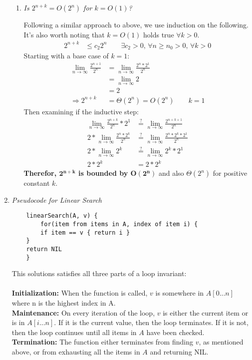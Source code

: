 \documentclass[12pt]{article}
\begin{document}
\begin{enumerate}
\begin{enumerate}
    \item \textit{Is $2^{n+k} = O(2^n)$ for $k = O(1)$?}    

    Following a similar approach to above, we use induction on the following. It's also worth noting that $k=O(1)$ holds true $\forall k>0$.
    \begin{align*}
    2^{n+k} &\leq c_2 2^n \qquad \exists c_2 > 0, \, \forall n\geq n_0 > 0, \, \forall k > 0 
    \end{align*}
    Starting with a base case of $k=1$:
    \begin{align*}
    \lim_{n\to\infty}\frac{2^{n+1}}{2^n} &= \lim_{n\to\infty}\frac{2^n*2^1}{2^n} \\
    &= \lim_{n\to\infty}2 \\
    &= 2 \\
    \Rightarrow 2^{n+k} &= \Theta(2^n) = O(2^n) \qquad k = 1
    \end{align*}
    Then examining if the inductive step:
    \begin{align*}
    \lim_{n\to\infty}\frac{2^{n+k}}{2^n} * 2^1 &\stackrel{?}{=} \lim_{n\to\infty}\frac{2^{n+k+1}}{2^n} \\
    2*\lim_{n\to\infty}\frac{2^n*2^k}{2^n} &\stackrel{?}{=} \lim_{n\to\infty}\frac{2^n*2^k*2^1}{2^n} \\
    2*\lim_{n\to\infty}2^k &\stackrel{?}{=} \lim_{n\to\infty}2^k*2^1 \\
    2*2^k &= 2*2^k
    \end{align*}
    \textbf{Therefor, $\mathbf{2^{n+k}}$ is bounded by $\mathbf{O(2^n)}$} and also $\Theta(2^n)$ for positive constant $k$.
    
    \end{enumerate}
    
    \newpage
    \item \textit{Pseudocode for Linear Search}
	\begin{verbatim}
	linearSearch(A, v) {
	    for(item from items in A, index of item i) {
        if item == v { return i }
    }
    return NIL
	}
	\end{verbatim}
    This solutions satisfies all three parts of a loop invariant: \\ \\
    \textbf{Initialization:} When the function is called, $v$ is somewhere in $A[0...n]$ where n is the highest index in A. \\
	\textbf{Maintenance:} On every iteration of the loop, $v$ is either the current item or is in $A[i...n]$. If it is the current value, then the loop terminates. If it is not, then the loop continues until all items in $A$ 
have been checked. \\
    \textbf{Termination:} The function either terminates from finding $v$, as mentioned above, or from exhausting all the items in $A$ and returning \textsf{NIL}.
    

\end{enumerate}
\end{document}
